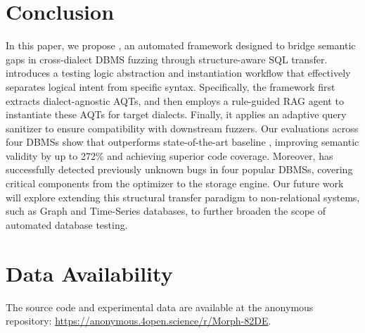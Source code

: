 \documentclass[sigconf,review,anonymous]{acmart}
\begin{document}
\section{Conclusion}
\label{sec:conclusion}
In this paper, we propose \tool{}, an automated framework designed to bridge semantic gaps in cross-dialect DBMS fuzzing through structure-aware SQL transfer. \tool{} introduces a testing logic abstraction and instantiation workflow that effectively separates logical intent from specific syntax. 
Specifically, the framework first extracts dialect-agnostic AQTs, and then employs a rule-guided RAG agent to instantiate these AQTs for target dialects. 
Finally, it applies an adaptive query sanitizer to ensure compatibility with downstream fuzzers. 
Our evaluations across four DBMSs show that \tool{} outperforms state-of-the-art baseline \sedar{}, improving semantic validity by up to 272\% and achieving superior code coverage. Moreover, \tool{} has successfully detected \bugcnt{} previously unknown bugs in four popular DBMSs, covering critical components from the optimizer to the storage engine. Our future work will explore extending this structural transfer paradigm to non-relational systems, such as Graph and Time-Series databases, to further broaden the scope of automated database testing.

\section{Data Availability}
The source code and experimental data are available at the anonymous repository: \url{https://anonymous.4open.science/r/Morph-82DE}.




 
\end{document}
